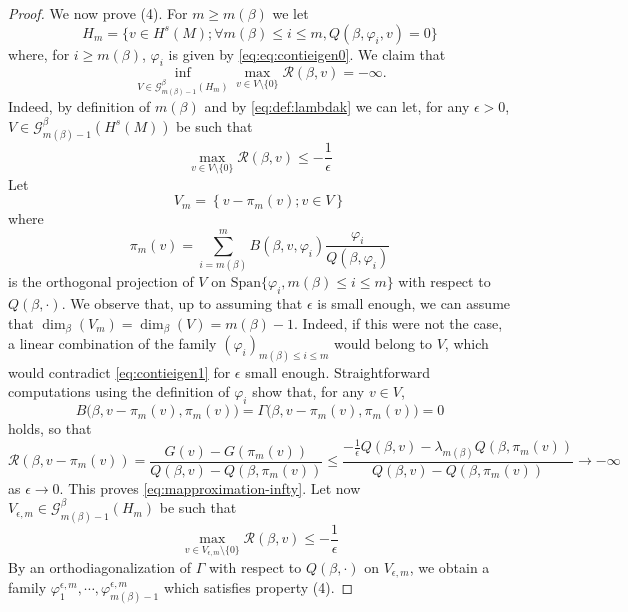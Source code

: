 \documentclass[10pt]{amsart}
\numberwithin{equation}{section}
\def\ep{{\varepsilon}}
\newcommand{\vp}{\varphi}
\def \ep{\epsilon}
\theoremstyle{plain}
\theoremstyle{remark}
\begin{document}
\begin{proof}
We now prove (4). For $m \geq m(\beta)$ we let
$$ H_m = \Big \{ v \in H^s(M) ; \forall m(\beta)\leq i \leq m,  Q(\beta,\vp_i,v) = 0  \Big \} $$
where, for $i \ge m(\beta)$, $\vp_i$ is given by \eqref{eq:eq:contieigen0}. We claim that
\begin{equation} \label{eq:mapproximation-infty} \inf_{V \in \mathcal{G}^\beta_{m(\beta)-1}(H_m)} \max_{v\in V\setminus \{0\}} \mathcal{R}(\beta,v) = -\infty .\end{equation}
Indeed, by definition of $m(\beta)$ and by \eqref{eq:def:lambdak} we can let, for any $\epsilon >0$, $V \in \mathcal{G}_{m(\beta)-1}^\beta(H^s(M))$ be such that 
\begin{equation} \label{eq:contieigen1}
 \max_{v\in V\setminus\{0\}} \mathcal{R}(\beta,v) \leq -\frac{1}{\epsilon} 
 \end{equation}
Let
$$ V_m = \left\{ v - \pi_m(v) ; v\in V \right\} $$
where
$$\pi_m(v) = \sum_{i=m(\beta)}^m B(\beta,v,\vp_i) \frac{\vp_i}{Q(\beta,\vp_i)} $$
is the orthogonal projection of $V$ on $ \text{Span} \big \{ \vp_i, m(\beta)\leq i \leq m \big \} $ with respect to $Q(\beta,\cdot)$. We observe that, up to assuming that $\epsilon$ is small enough, we can assume that  $\dim_\beta(V_m) = \dim_\beta(V) = m(\beta)-1$. Indeed, if this were not the case, a linear combination of the family $(\vp_i)_{m(\beta)\leq i \leq m}$ would belong to $V$, which would contradict \eqref{eq:contieigen1} for $\ep$ small enough. Straightforward computations using the definition of $\vp_i$ show that, for any $v \in V$,
$$ B \big( \beta, v- \pi_m(v), \pi_m(v) \big) = \Gamma \big( \beta, v - \pi_m(v), \pi_m(v) \big) = 0$$
holds, so that 
$$ \mathcal{R}(\beta, v - \pi_m(v) ) = \frac{G(v) - G(\pi_m(v)) }{Q(\beta,v) - Q(\beta,\pi_m(v))} \leq \frac{-\frac{1}{\epsilon} Q(\beta,v) - \lambda_{m(\beta)} Q(\beta,\pi_m(v))}{Q(\beta,v)-Q(\beta,\pi_m(v))} \to -\infty$$
as $\epsilon \to 0$. This proves \eqref{eq:mapproximation-infty}. Let now $V_{\epsilon,m} \in \mathcal{G}^\beta_{m(\beta)-1}(H_m)$ be such that 
$$ \max_{v\in V_{\epsilon,m}\setminus \{0\}} \mathcal{R}(\beta,v) \leq - \frac{1}{\epsilon} $$
By an orthodiagonalization of $\Gamma$ with respect to $Q(\beta,\cdot)$ on $V_{\epsilon,m}$, we obtain a family $\vp_1^{\epsilon,m},\cdots,\vp_{m(\beta)-1}^{\epsilon,m}$ which satisfies property (4).

\smallskip 


\end{proof}
\end{document}
